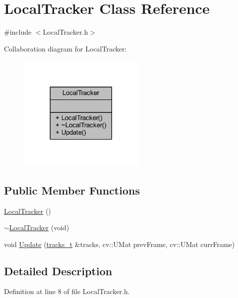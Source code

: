 \hypertarget{class_local_tracker}{}\section{Local\+Tracker Class Reference}
\label{class_local_tracker}


{\ttfamily \#include $<$Local\+Tracker.\+h$>$}



Collaboration diagram for Local\+Tracker\+:\nopagebreak
\begin{figure}[H]
\begin{center}
\leavevmode
\includegraphics[width=173pt]{class_local_tracker__coll__graph}
\end{center}
\end{figure}
\subsection*{Public Member Functions}
\begin{DoxyCompactItemize}
\item 
\mbox{\hyperlink{class_local_tracker_a5b29d3a99a06b3efb3ef33b64965d217}{Local\+Tracker}} ()
\item 
\mbox{\hyperlink{class_local_tracker_acf04cd253573c578a96292ba0af0dc94}{$\sim$\+Local\+Tracker}} (void)
\item 
void \mbox{\hyperlink{class_local_tracker_a7fad09ebaf507de2a400ec17ec96fa56}{Update}} (\mbox{\hyperlink{track_8h_aaa9881295be74ce8bd6990b9aafaf788}{tracks\+\_\+t}} \&tracks, cv\+::\+U\+Mat prev\+Frame, cv\+::\+U\+Mat curr\+Frame)
\end{DoxyCompactItemize}


\subsection{Detailed Description}


Definition at line 8 of file Local\+Tracker.\+h.



